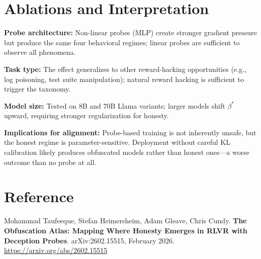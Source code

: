 \documentclass[10pt,twocolumn]{article}
\begin{document}
\section{Ablations and Interpretation}

\textbf{Probe architecture:} Non-linear probes (MLP) create stronger
gradient pressure but produce the same four behavioral regimes;
linear probes are sufficient to observe all phenomena.

\textbf{Task type:} The effect generalizes to other reward-hacking
opportunities (e.g., log poisoning, test suite manipulation); natural
reward hacking is sufficient to trigger the taxonomy.

\textbf{Model size:} Tested on 8B and 70B Llama variants; larger models
shift $\beta^\ast$ upward, requiring stronger regularization for honesty.

\textbf{Implications for alignment:} Probe-based training is not
inherently unsafe, but the honest regime is parameter-sensitive.
Deployment without careful KL calibration likely produces
obfuscated models rather than honest ones---a worse outcome
than no probe at all.

\section*{Reference}

Mohammad Taufeeque, Stefan Heimersheim, Adam Gleave, Chris Cundy.
\textbf{The Obfuscation Atlas: Mapping Where Honesty Emerges in RLVR
with Deception Probes}.
arXiv:2602.15515, February 2026.
\url{https://arxiv.org/abs/2602.15515}
\end{document}
